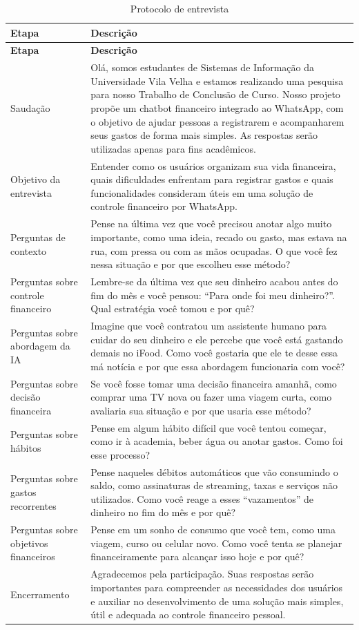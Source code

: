 \small
\begin{longtable}{>{\raggedright\arraybackslash}p{}>{\raggedright\arraybackslash}p{}}
\caption{Protocolo de entrevista}\label{tab:protocolo-md}\\
\hline
\textbf{Etapa} & \textbf{Descrição} \\
\hline
\endfirsthead
\hline
\textbf{Etapa} & \textbf{Descrição} \\
\hline
\endhead
Saudação & Olá, somos estudantes de Sistemas de Informação da Universidade Vila Velha e estamos realizando uma pesquisa para nosso Trabalho de Conclusão de Curso. Nosso projeto propõe um chatbot financeiro integrado ao WhatsApp, com o objetivo de ajudar pessoas a registrarem e acompanharem seus gastos de forma mais simples. As respostas serão utilizadas apenas para fins acadêmicos. \\
Objetivo	da	entrevista & Entender como os usuários organizam sua vida financeira, quais dificuldades enfrentam para registrar gastos e quais funcionalidades consideram úteis em uma solução de controle financeiro por WhatsApp. \\
Perguntas	de	contexto & Pense na última vez que você precisou anotar algo muito importante, como uma ideia, recado ou gasto, mas estava na rua, com pressa ou com as mãos ocupadas. O que você fez nessa situação e por que escolheu esse método? \\
Perguntas sobre controle financeiro & Lembre-se da última vez que seu dinheiro acabou antes do fim do mês e você pensou: “Para onde foi meu dinheiro?”. Qual estratégia você tomou e por quê? \\
Perguntas sobre abordagem da IA & Imagine que você contratou um assistente humano para cuidar do seu dinheiro e ele percebe que você está gastando demais no iFood. Como você gostaria que ele te desse essa má notícia e por que essa abordagem funcionaria com você? \\
Perguntas sobre decisão financeira & Se você fosse tomar uma decisão financeira amanhã, como comprar uma TV nova ou fazer uma viagem curta, como avaliaria sua situação e por que usaria esse método? \\
Perguntas sobre hábitos & Pense em algum hábito difícil que você tentou começar, como ir à academia, beber água ou anotar gastos. Como foi esse processo? \\
Perguntas sobre gastos recorrentes & Pense naqueles débitos automáticos que vão consumindo o saldo, como assinaturas de streaming, taxas e serviços não utilizados. Como você reage a esses “vazamentos” de dinheiro no fim do mês e por quê? \\
Perguntas sobre objetivos financeiros & Pense em um sonho de consumo que você tem, como uma viagem, curso ou celular novo. Como você tenta se planejar financeiramente para alcançar isso hoje e por quê? \\
Encerramento & Agradecemos pela participação. Suas respostas serão importantes para compreender as necessidades dos usuários e auxiliar no desenvolvimento de uma solução mais simples, útil e adequada ao controle financeiro pessoal. \\
\hline
\end{longtable}
\normalsize

